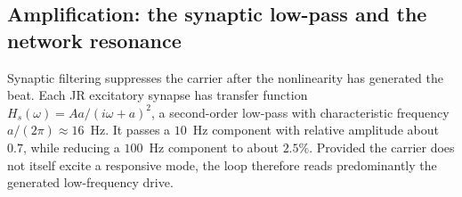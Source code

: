 \documentclass[11pt,a4paper]{article}
\begin{document}
\subsection{Amplification: the synaptic low-pass and the network resonance}\label{sec:carrier}
Synaptic filtering suppresses the carrier after the nonlinearity has generated
the beat. Each JR excitatory synapse has transfer function
$H_s(\omega)=Aa/(i\omega+a)^2$, a second-order low-pass with characteristic
frequency $a/(2\pi)\approx16$~Hz. It passes a $10$~Hz component with relative
amplitude about $0.7$, while reducing a $100$~Hz component to about $2.5\%$. Provided the carrier does not itself excite a responsive
mode, the loop therefore reads predominantly the generated low-frequency drive.

\end{document}
